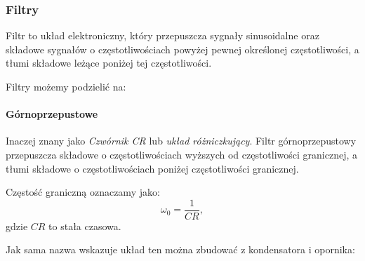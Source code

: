\documentclass{article}
\begin{document}
        \pagebreak
        \fancyfoot[L]{}
      \subsubsection{Filtry}
        Filtr to układ elektroniczny, który przepuszcza sygnały sinusoidalne oraz składowe sygnałów o częstotliwościach powyżej pewnej określonej częstotliwości, a tłumi składowe leżące poniżej tej częstotliwości.
        
        Filtry możemy podzielić na:

          \paragraph{Górnoprzepustowe}
            \mbox{}\newline
            Inaczej znany jako \textit{Czwórnik CR} lub \textit{układ różniczkujący}. Filtr górnoprzepustowy przepuszcza składowe o częstotliwościach wyższych od częstotliwości granicznej, a tłumi składowe o częstotliwościach poniżej częstotliwości granicznej.

            Częstość graniczną oznaczamy jako:
            \begin{equation}
               \omega_0 = \frac{1}{CR} ,
            \end{equation}
            gdzie $CR$ to stała czasowa.

            Jak sama nazwa wskazuje układ ten można zbudować z kondensatora i opornika:
\end{document}
